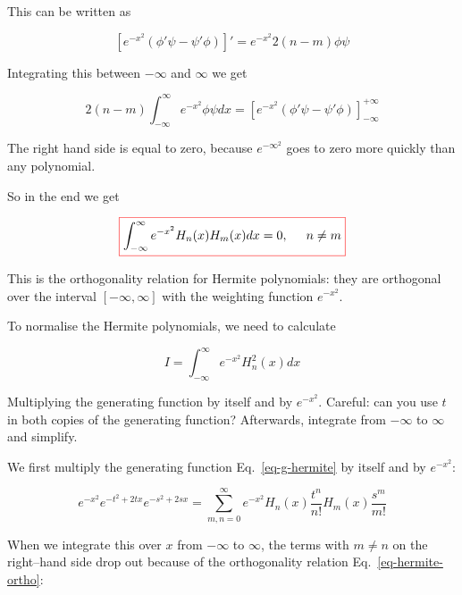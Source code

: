 This can be written as

\begin{equation}
\left[e^{-x^2}\left(\phi'\psi -\psi'\phi\right)\right]' = e^{-x^2}2(n-m)\phi\psi
\end{equation} 

Integrating this between $-\infty$ and $\infty$ we get

\begin{equation}
2(n-m)\int_{-\infty}^{\infty}e^{-x^2}\phi\psi dx = \left[e^{-x^2}\left(\phi'\psi -\psi'\phi\right)\right]_{-\infty}^{+\infty}
\end{equation} 

The right hand side is equal to zero, because $e^{-{\infty}^2}$ goes to zero more quickly than any polynomial.

So in the end we get

\begin{equation}
\fbox{$\displaystyle
\int_{-\infty}^{\infty}e^{-x^2}H_n(x)H_m(x)dx = 0, \hspace{0.5cm} n \ne m \label{eq-hermite-ortho}
$}
\end{equation} 

This is the orthogonality relation for Hermite polynomials: they are orthogonal over the interval $[-\infty, \infty]$ with the weighting function $e^{-x^2}$.


To normalise the Hermite polynomials, we need to calculate

\begin{equation}
I = \int_{-\infty}^{\infty}e^{-x^2}H_n^2(x)dx
\end{equation}

\begin{cue}
Multiplying the generating function by itself and by $e^{-x^2}$. Careful: can you use $t$ in both copies of the generating function? Afterwards, integrate from $-\infty$ to $\infty$ and simplify. 
\end{cue}

We first multiply the generating function Eq.~\ref{eq-g-hermite} by itself and by $e^{-x^2}$:

\begin{equation}
e^{-x^2} e^{-t^2 + 2tx} e^{-s^2 + 2sx}= \sum_{m, n = 0}^{\infty}e^{-x^2} H_n(x)\frac{t^n}{n!}H_m(x)\frac{s^m}{m!}
\end{equation} 

When we integrate this over $x$ from $-\infty$ to $\infty$, the terms with $m \ne n$ on the right--hand side drop out because of the orthogonality relation Eq.~\ref{eq-hermite-ortho}:

